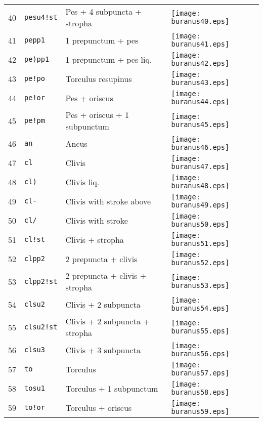 \documentclass{scrarticle}
\begin{document}
\begin{longtable}{l|l|l|l}
40 & \texttt{pesu4!st} & Pes + 4 subpuncta + stropha & \texttt{[image: buranus40.eps]} \\
41 & \texttt{pepp1} & 1 prepunctum + pes & \texttt{[image: buranus41.eps]} \\
42 & \texttt{pe)pp1} & 1 prepunctum + pes liq. & \texttt{[image: buranus42.eps]} \\
43 & \texttt{pe!po} & Torculus resupinus & \texttt{[image: buranus43.eps]} \\
44 & \texttt{pe!or} & Pes + oriscus & \texttt{[image: buranus44.eps]} \\
45 & \texttt{pe!pm} & Pes + oriscus + 1 subpunctum & \texttt{[image: buranus45.eps]} \\
46 & \texttt{an} & Ancus & \texttt{[image: buranus46.eps]} \\
47 & \texttt{cl} & Clivis & \texttt{[image: buranus47.eps]} \\
48 & \texttt{cl)} & Clivis liq. & \texttt{[image: buranus48.eps]} \\
49 & \texttt{cl-} & Clivis with stroke above & \texttt{[image: buranus49.eps]} \\
50 & \texttt{cl/} & Clivis with stroke & \texttt{[image: buranus50.eps]} \\
51 & \texttt{cl!st} & Clivis + stropha & \texttt{[image: buranus51.eps]} \\
52 & \texttt{clpp2} & 2 prepuncta + clivis & \texttt{[image: buranus52.eps]} \\
53 & \texttt{clpp2!st} & 2 prepuncta + clivis + stropha & \texttt{[image: buranus53.eps]} \\
54 & \texttt{clsu2} & Clivis + 2 subpuncta & \texttt{[image: buranus54.eps]} \\
55 & \texttt{clsu2!st} & Clivis + 2 subpuncta + stropha & \texttt{[image: buranus55.eps]} \\
56 & \texttt{clsu3} & Clivis + 3 subpuncta & \texttt{[image: buranus56.eps]} \\
57 & \texttt{to} & Torculus & \texttt{[image: buranus57.eps]} \\
58 & \texttt{tosu1} & Torculus + 1 subpunctum & \texttt{[image: buranus58.eps]} \\
59 & \texttt{to!or} & Torculus + oriscus & \texttt{[image: buranus59.eps]} \\

\end{longtable}
\end{document}
